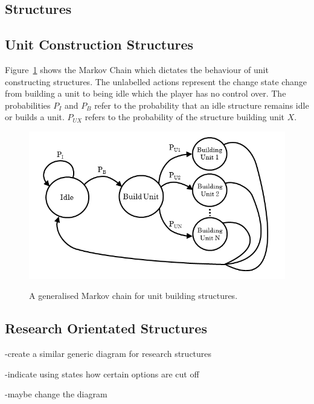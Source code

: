 \subsection{Structures}

\subsection{Unit Construction Structures}


Figure~\ref{fig:struct_units} shows the Markov Chain which dictates the behaviour of unit constructing structures. The unlabelled actions represent the change state change from building a unit to being idle which the player has no control over. The probabilities \(P_{I}\) and \(P_{B}\) refer to the probability that an idle structure remains idle or builds a unit. \(P_{UX}\) refers to the probability of the structure building unit \(X\).

\begin{figure}
\centering
\includegraphics[scale=0.8, trim = 0cm 0cm 0cm 0cm]{diagrams/building_units}
\label{fig:struct_units}
\caption{A generalised Markov chain for unit building structures.}
\end{figure}

\subsection{Research Orientated Structures}

-create a similar generic diagram for research structures

-indicate using states how certain options are cut off

-maybe change the diagram

